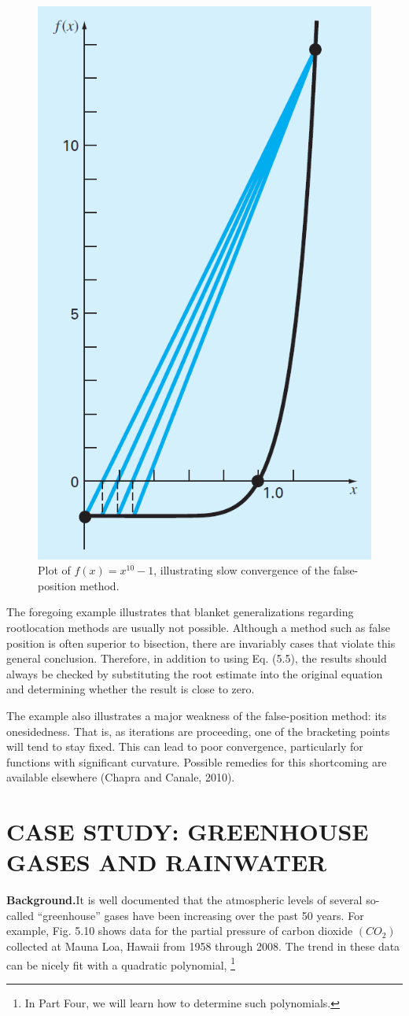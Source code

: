 \documentclass[../main.tex]{subfiles}
\begin{document}
\begin{example}
    \begin{figure}[h]
        \includegraphics[width=0.35\linewidth]{./images/fig_5_9}
        \caption{Plot of $f (x) = x^{10} - 1$, illustrating slow convergence of the false-position method.}
    \end{figure}
\end{example}
\newpage

The foregoing example illustrates that blanket generalizations regarding rootlocation
methods are usually not possible. Although a method such as false position is
often superior to bisection, there are invariably cases that violate this general conclusion.
Therefore, in addition to using Eq. (5.5), the results should always be checked by substituting
the root estimate into the original equation and determining whether the result is
close to zero.

The example also illustrates a major weakness of the false-position method: its onesidedness.
That is, as iterations are proceeding, one of the bracketing points will tend to
stay fixed. This can lead to poor convergence, particularly for functions with significant
curvature. Possible remedies for this shortcoming are available elsewhere (Chapra and
Canale, 2010).\\
\bigskip

\section[CASE STUDY: GREENHOUSE GASES AND RAINWATER]{CASE STUDY: GREENHOUSE GASES AND RAINWATER}
\noindent\textbf{Background.}\quad It is well documented that the atmospheric levels of several so-called
``greenhouse'' gases have been increasing over the past 50 years. For example, Fig. 5.10
shows data for the partial pressure of carbon dioxide $(CO_2)$ collected at Mauna Loa, Hawaii
from 1958 through 2008. The trend in these data can be nicely fit with a quadratic polynomial,
\footnote{In Part Four, we will learn how to determine such polynomials.}\\
\end{document}
